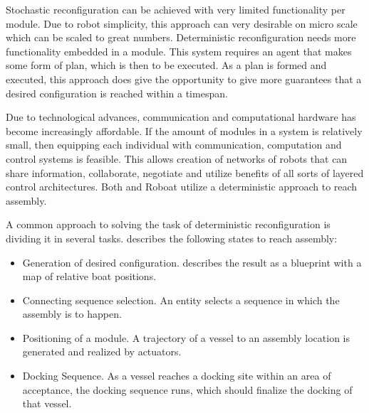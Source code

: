 Stochastic reconfiguration can be achieved with very limited functionality per module. Due to robot simplicity, this approach can very desirable on micro scale which can be scaled to great numbers.
Deterministic reconfiguration needs more functionality embedded in a module. This system requires an agent that makes some form of plan, which is then to be executed. As a plan is formed and executed, this approach does give the opportunity to give more guarantees that a desired configuration is reached within a timespan. 

Due to technological advances, communication and computational hardware has become increasingly affordable. If the amount of modules in a system is relatively small, then equipping each individual with communication, computation and control systems is feasible. This allows creation of networks of robots that can share information, collaborate, negotiate and utilize benefits of all sorts of layered control architectures. Both \citet{o2014self} and Roboat utilize a deterministic approach to reach assembly. 

A common approach to solving the task of deterministic reconfiguration is dividing it in several tasks. \citet{o2014self} describes the following states to reach assembly:

\begin{itemize}
	\item Generation of desired configuration. \citet{o2014self} describes the result as a blueprint with a map of relative boat positions. 
	\item Connecting sequence selection. An entity selects a sequence in which the assembly is to happen. 
	\item Positioning of a module.  A trajectory of a vessel to an assembly location is generated and realized by actuators. 
	\item Docking Sequence. As a vessel reaches a docking site within an area of acceptance, the docking sequence runs, which should finalize the docking of that vessel. 
\end{itemize}


